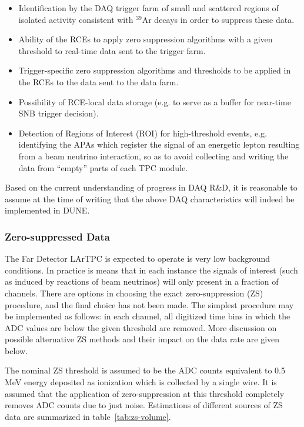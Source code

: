 \begin{itemize}

\item Identification by the DAQ trigger farm of small and scattered regions of isolated activity
  consistent with $^{39}$Ar decays in order to suppress these data.

\item Ability of the RCEs to apply zero suppression algorithms
with a given threshold to real-time data sent to the trigger farm.

\item Trigger-specific zero suppression algorithms and thresholds to be applied
in the RCEs to the data sent to the data farm.

\item Possibility of RCE-local data storage (e.g. to serve as a buffer for near-time SNB trigger decision).

\item Detection of Regions of Interest (ROI) for high-threshold events, e.g. identifying the APAs
which register the signal of an energetic lepton resulting from a beam neutrino interaction, so as
to avoid collecting and writing the data from ``empty'' parts of each TPC module.

\end{itemize}

Based on the current understanding of progress in DAQ R\&D, it is reasonable to assume at the time of
writing that the above DAQ characteristics will indeed be implemented in DUNE.




\subsubsection{Zero-suppressed Data}
\label{sec:zs-data}
The Far Detector LArTPC is expected to operate is very low background conditions. In practice
is means that in each instance the signals of interest (such as induced by reactions of beam neutrinos)
will only present in a fraction of channels. There are options in choosing the exact zero-suppression (ZS)
procedure, and the final choice has not been made. The simplest procedure may be implemented
as follows: in each channel, all digitized time bins in which the ADC values are below the given threshold
are removed. More discussion on possible alternative ZS methods and their impact on the data rate are given below.

The nominal ZS threshold is assumed to be the ADC counts equivalent to 0.5\,MeV energy deposited as
ionization which is collected by a single wire. It is assumed that the application of zero-suppression at this
threshold completely removes ADC counts due to just noise. %
Estimations of different sources of ZS data are summarized in table~\ref{tab:zs-volume}.

